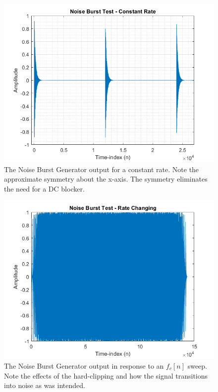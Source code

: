 \documentclass[../main.tex]{subfiles}
\begin{document}
\begin{figure}[hb]
    \centering
    \includegraphics[scale=.65]{./images/plots/NBGTest1.png}
    \caption{The Noise Burst Generator output for a constant rate. Note the approximate symmetry about the x-axis. The symmetry eliminates the need for a DC blocker.}
    \label{fig:NBGT1}
\end{figure}

\begin{figure}[ht]
    \centering
    \includegraphics[scale=.65]{./images/plots/NBGTest2.png}
    \caption{The Noise Burst Generator output in response to an $f_c[n]$ sweep. Note the effects of the hard-clipping and how the signal transitions into noise as was intended.}
    \label{fig:NBGT2}
\end{figure}
\end{document}

